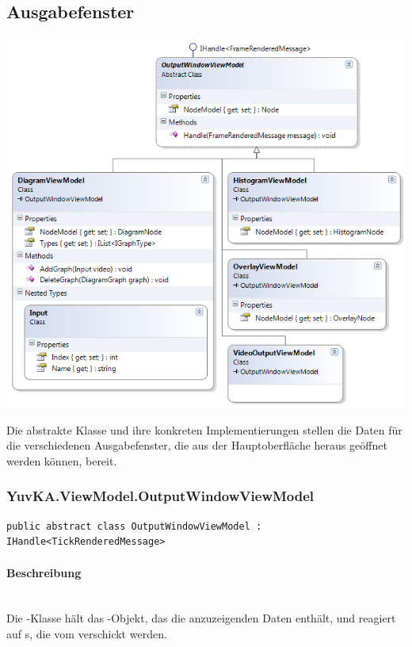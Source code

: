 \subsection{Ausgabefenster}
\begin{center}\includegraphics[scale=0.7]{YuvKA.ViewModel/outputs.png} \\
\end{center}
Die abstrakte Klasse  und ihre konkreten Implementierungen stellen die Daten für die verschiedenen Ausgabefenster, die aus der Hauptoberfläche heraus geöffnet werden können, bereit.

\subsubsection{YuvKA.ViewModel.OutputWindowViewModel}

\begin{verbatim}
public abstract	class OutputWindowViewModel : IHandle<TickRenderedMessage>
\end{verbatim}

\paragraph{Beschreibung}~\\
Die -Klasse hält das -Objekt, das die anzuzeigenden Daten enthält, und reagiert auf s, die vom  verschickt werden.

